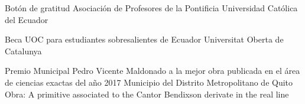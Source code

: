 \documentclass[
	a4paper,
	maincolor=cvblue!70!blue,
	sidecolor=gray!30,
	sectioncolor=cvblue!70!blue,
    sidebarwidth=7.5cm,
	topbottommargin=20pt,
	leftrightmargin=20pt,
]{fortysecondscv}
\begin{document}
    {Botón de gratitud}
    {Asociación de Profesores de la Pontificia Universidad Católica del Ecuador}
    {}

    {Beca UOC para estudiantes sobresalientes de Ecuador}
    {Universitat Oberta de Catalunya}
    {}
    
    {Premio Municipal Pedro Vicente Maldonado a la mejor obra publicada en el área de ciencias exactas del año 2017}
    {Municipio del Distrito Metropolitano de Quito}
    {Obra: A primitive associated to the Cantor Bendixson derivate in the real line}
    

\end{document}
